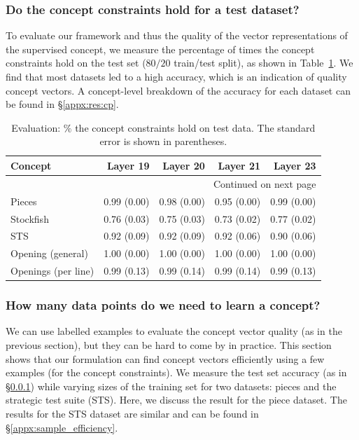 \documentclass{article}
\begin{document}
\subsubsection{Do the concept constraints hold for a test dataset?
} \label{res:test_constraints}
To evaluate our framework and thus the quality of the vector representations of the supervised concept, we measure the percentage of times the concept constraints hold on the test set ($80/20$ train/test split), as shown in Table~\ref{table:constraint_percentage}. 
We find that most datasets led to a high accuracy, which is an indication of quality concept vectors. A concept-level breakdown of the accuracy for each dataset can be found in \S\ref{appx:res:cp}.

\begin{longtable}{lrrrr}
\caption{Evaluation: $\%$ the concept constraints hold on test data. The standard error is shown in parentheses.}
\label{table:constraint_percentage} \\ 
\toprule
 Concept  &  Layer 19 &  Layer 20 &  Layer 21 &  Layer 23 \\
\midrule
\endhead
\midrule
\multicolumn{5}{r}{{Continued on next page}} \\
\midrule
\endfoot

\bottomrule
\endlastfoot
    Pieces &     0.99 (0.00) &     0.98 (0.00) &     0.95 (0.00) &     0.99 (0.00) \\
 Stockfish &     0.76 (0.03) &     0.75 (0.03)&     0.73 (0.02) &     0.77 (0.02)\\
       STS &     0.92 (0.09) &     0.92 (0.09)&     0.92 (0.06)&     0.90 (0.06) \\
   Opening (general) &     1.00 (0.00)&     1.00 (0.00) &     1.00 (0.00) &     1.00 (0.00) \\
  Openings (per line) &     0.99 (0.13) &     0.99 (0.14) &     0.99 (0.14) &     0.99 (0.13) \\
\end{longtable}

\subsubsection{How many data points do we need to learn a concept?} \label{res:sample_eff}
We can use labelled examples to evaluate the concept vector quality (as in the previous section), but they can be hard to come by in practice. This section shows that our formulation can find concept vectors efficiently using a few examples (for the concept constraints). 
We measure the test set accuracy (as in \S\ref{res:test_constraints}) while varying sizes of the training set for two datasets: pieces and the strategic test suite (STS). Here, we discuss the result for the piece dataset. The results for the STS dataset are similar and can be found in \S\ref{appx:sample_efficiency}.
\end{document}
